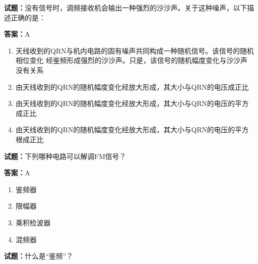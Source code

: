 \documentclass{ctexbook}
\begin{document}




\vspace{1em}

\textbf{试题：}没有信号时，调频接收机会输出一种强烈的沙沙声。关于这种噪声，以下描述正确的是： 

\textbf{答案：}A 

\begin{enumerate}[leftmargin=3em]
  \item 天线收到的QRN与机内电路的固有噪声共同构成一种随机信号。该信号的随机相位变化
经鉴频形成强烈的沙沙声。只是，该信号的随机幅度变化与沙沙声没有关系 

  \item 由天线收到的QRN的随机幅度变化经放大形成，其大小与QRN的电压成正比 

  \item 由天线收到的QRN的随机幅度变化经放大形成，其大小与QRN的电压的平方成正比 

  \item 由天线收到的QRN的随机幅度变化经放大形成，其大小与QRN的电压的平方根成正比 

\end{enumerate}





\vspace{1em}

\textbf{试题：}下列哪种电路可以解调FM信号？ 

\textbf{答案：}A 

\begin{enumerate}[leftmargin=3em]
  \item 鉴频器 

  \item 限幅器 

  \item 乘积检波器 

  \item 混频器 

\end{enumerate}





\vspace{1em}

\textbf{试题：}什么是“鉴频”？ 
\end{document}
